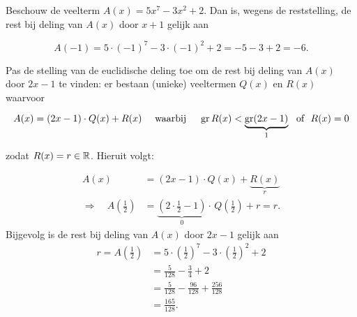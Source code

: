 \documentclass{ximera}
\begin{document}
\begin{example} 
Beschouw de veelterm $A(x) = 5x^7 - 3x^2 + 2$. Dan is, wegens de reststelling, de rest bij deling van $A(x)$ door $x+1$ gelijk aan

\[
A(-1) = 5 \cdot (-1)^7 - 3 \cdot (-1)^2 + 2 = -5-3+2 = -6.
\]

Pas de stelling van de euclidische deling toe om de rest bij deling van $A(x)$ door $2x-1$ te vinden: er bestaan (unieke) veeltermen $Q(x)$ en $R(x)$ waarvoor

\[
A(x) = (2x-1)\cdot Q(x) + R(x) \quad \text{ waarbij } \quad \operatorname{gr} R(x) < \underbrace{\operatorname{gr} (2x-1)}_{1} \,\, \text{ of } \,\, R(x) = 0
\]

zodat $R(x) = r \in \mathbb{R}$. Hieruit volgt:

\begin{align*}
A(x) & = (2x-1) \cdot Q(x) + \underbrace{R(x)}_{r} \\
\Rightarrow \quad A\left(\frac{1}{2}\right) & = \underbrace{\left(2 \cdot \frac{1}{2}-1\right)}_{0} \cdot \,Q\left(\frac{1}{2}\right) + r = r. 
\end{align*} 
Bijgevolg is de rest bij deling van $A(x)$ door $2x-1$ gelijk aan
\begin{align*}
r = A\left(\frac{1}{2}\right) & = 5 \cdot \left(\frac{1}{2}\right)^7 - 3 \cdot \left(\frac{1}{2}\right)^2 + 2 \\
& = \frac{5}{128} - \frac{3}{4} + 2 \\
& = \frac{5}{128} - \frac{96}{128} + \frac{256}{128} \\
& = \frac{165}{128}.
\end{align*}
\end{example} 
\end{document}
